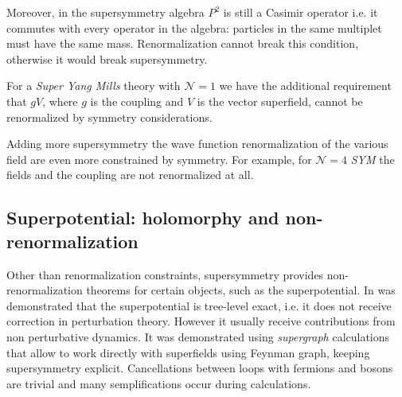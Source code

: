 Moreover, in the supersymmetry algebra $P^2$ is still a Casimir operator i.e. it commutes with every operator in the algebra: particles in the same multiplet must have the same mass.
Renormalization cannot break this condition, otherwise it would break supersymmetry.

For a \emph{Super Yang Mills} theory with $\mathcal{N} = 1$ we have the additional requirement that $g V$, where $g$ is the coupling and $V$ is the vector superfield, cannot be renormalized by symmetry considerations. 

Adding more supersymmetry the wave function renormalization of the various field are even more constrained by symmetry.
For example, for $\mathcal{N}=4$ \emph{SYM}  the fields and the coupling are not renormalized at all.



\subsection{Superpotential: holomorphy and non-renormalization}
Other than renormalization constraints, supersymmetry provides non-renormalization theorems for certain objects, such as the superpotential.
In \cite{Grisaru:1979wc} was demonstrated that the superpotential is tree-level exact, i.e. it does not receive correction in perturbation theory. 
However it usually receive contributions from non perturbative dynamics.
It was demonstrated using \emph{supergraph} calculations that allow to work directly with superfields using Feynman graph, keeping supersymmetry explicit. 
Cancellations between loops with fermions and bosons are trivial and many semplifications occur during calculations.

